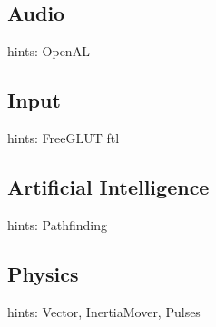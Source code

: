 \documentclass[acmtocl,acmnow]{acmtrans2m}
\begin{document}
\subsection{Audio}
hints: OpenAL
\subsection{Input}
hints: FreeGLUT ftl
\subsection{Artificial Intelligence}
hints: Pathfinding
\subsection{Physics}
hints: Vector, InertiaMover, Pulses

\begin{thebibliography}{}

\end{thebibliography}

\begin{received}
\end{received}
\end{document}
